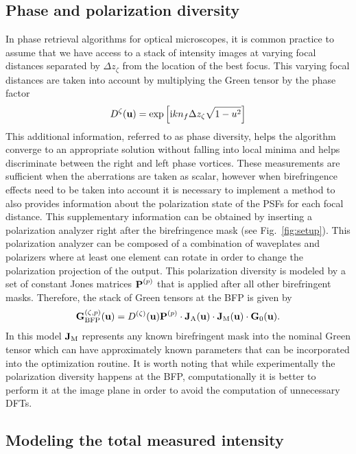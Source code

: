 \documentclass[reprint,aps,pra,superscriptaddress,
amsmath,amssymb]{revtex4-1}
\begin{document}
\subsection{Phase and polarization diversity}

In phase retrieval algorithms for optical microscopes, it is common 
practice to assume that we have access to a stack of intensity images 
at varying focal distances separated by $\Delta z_{\zeta}$ from the 
location of the best focus. This varying focal 
distances are taken into account by multiplying the Green tensor by 
the phase factor
\begin{align}
D^\zeta (\textbf u) =  \exp \left[ \text{i} k n_f \Delta z_\zeta  \sqrt{1 - u^2} \right] 
\end{align}
This additional information, referred to as phase diversity, helps the 
algorithm converge to an appropriate solution without falling into 
local minima and helps discriminate between the right and left phase vortices. 
These measurements are sufficient when the aberrations are taken as 
scalar, however when birefringence effects need to be taken into account 
it is necessary to implement a method to also provides information 
about the polarization state of the PSFs for each focal distance. 
This supplementary information can be obtained by inserting a polarization 
analyzer right after the 
birefringence mask (see Fig.~\ref{fig:setup}). This polarization analyzer 
can be composed of a combination of waveplates and polarizers where at least
one element can rotate in order to change the polarization projection of 
the output. This polarization diversity is modeled by a set of constant 
Jones matrices $\textbf P^{(p)}$ that is applied after all other birefringent masks.
Therefore, the stack of Green tensors at the BFP is given by
\begin{align}
\textbf G^{(\zeta ,p)}_\text{BFP} (\textbf u) =  D^{(\zeta )} (\textbf u) \textbf P^{(p)} 
\cdot \textbf J_\text{A}(\textbf u) \cdot \textbf J_\text{M}(\textbf u) \cdot \textbf G_0  (\textbf u).
\end{align}
In this model $\textbf J_\text{M}$ represents any known
birefringent mask into the nominal Green tensor which can have approximately known
parameters that can be incorporated into the optimization routine.
It is worth noting that while experimentally the polarization diversity happens at 
the BFP, computationally it is better to perform it at the image plane in 
order to avoid the computation of unnecessary DFTs.


\subsection{Modeling the total measured intensity}
\end{document}
